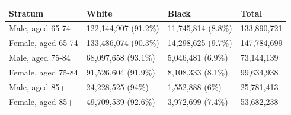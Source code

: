 \begin{table}[ht]
\centering
\begin{tabular}{llll}
  \hline
Stratum & White & Black & Total \\ 
  \hline
\hspace{20pt}Male, aged 65-74 & 122,144,907 (91.2\%) & 11,745,814 (8.8\%) & 133,890,721 \\ 
  \hspace{20pt}Female, aged 65-74 & 133,486,074 (90.3\%) & 14,298,625 (9.7\%) & 147,784,699 \\ 
  \hspace{20pt}Male, aged 75-84 & 68,097,658 (93.1\%) & 5,046,481 (6.9\%) & 73,144,139 \\ 
  \hspace{20pt}Female, aged 75-84 & 91,526,604 (91.9\%) & 8,108,333 (8.1\%) & 99,634,938 \\ 
  \hspace{20pt}Male, aged 85+ & 24,228,525 (94\%) & 1,552,888 (6\%) & 25,781,413 \\ 
  \hspace{20pt}Female, aged 85+ & 49,709,539 (92.6\%) & 3,972,699 (7.4\%) & 53,682,238 \\ 
   \hline
\end{tabular}
\end{table}
